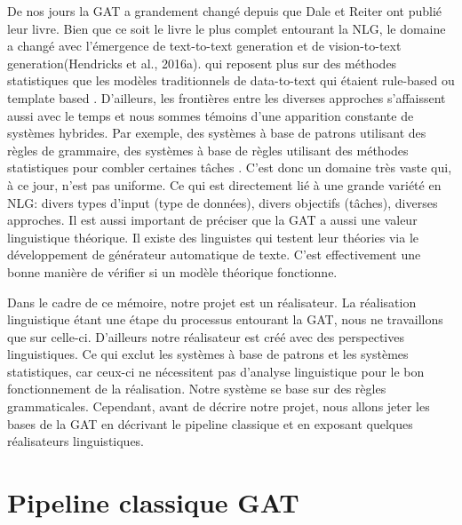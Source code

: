 De nos jours la \ac{GAT} a grandement changé depuis que Dale et Reiter ont publié leur livre. Bien que ce soit le livre le plus complet entourant la NLG, le domaine a changé avec l'émergence de text-to-text generation et de vision-to-text generation(Hendricks et al., 2016a). qui reposent plus sur des méthodes statistiques que les modèles traditionnels de data-to-text qui étaient rule-based ou template based \citep{gatt18}. D'ailleurs, les frontières entre les diverses approches s'affaissent aussi avec le temps et nous sommes témoins d'une apparition constante de systèmes hybrides. Par exemple, des systèmes à base de patrons utilisant des règles de grammaire, des systèmes à base de règles utilisant des méthodes statistiques pour combler certaines tâches \citep{gatt18}. C'est donc un domaine très vaste qui, à ce jour, n'est pas uniforme. Ce qui est directement lié à une grande variété en NLG: divers types d'input (type de données), divers objectifs (tâches), diverses approches. Il est aussi important de préciser que la \ac{GAT} a aussi une valeur linguistique théorique. Il existe des linguistes qui testent leur théories via le développement de générateur automatique de texte. C'est effectivement une bonne manière de vérifier si un modèle théorique fonctionne\citep{DanlosPresentationmodelegeneration1983}. 

Dans le cadre de ce mémoire, notre projet est un réalisateur. La réalisation linguistique étant une étape du processus entourant la \ac{GAT}, nous ne travaillons que sur celle-ci. D'ailleurs notre réalisateur est créé avec des perspectives linguistiques. Ce qui exclut les systèmes à base de patrons et les systèmes statistiques, car ceux-ci ne nécessitent pas d'analyse linguistique pour le bon fonctionnement de la réalisation. Notre système se base sur des règles grammaticales. Cependant, avant de décrire notre projet, nous allons jeter les bases de la \ac{GAT} en décrivant le pipeline classique et en exposant quelques réalisateurs linguistiques.

\section{Pipeline classique GAT}

